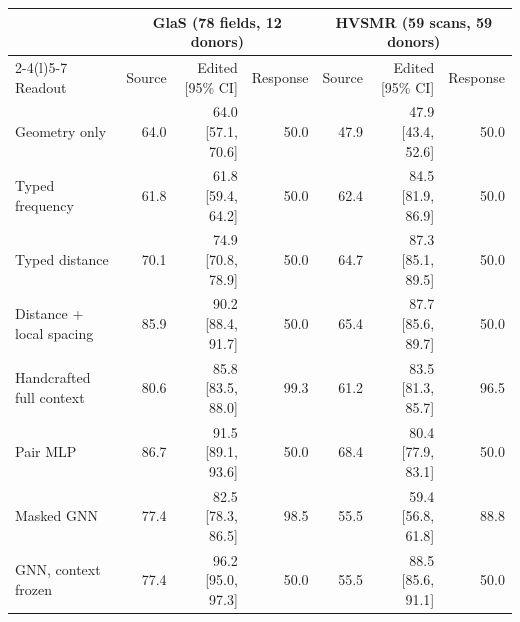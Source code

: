 \begin{tabular}{@{}lrrr@{\hspace{10pt}}rrr@{}}
\toprule
 & \multicolumn{3}{c}{GlaS (78 fields, 12 donors)} & \multicolumn{3}{c}{HVSMR (59 scans, 59 donors)} \\
\cmidrule(lr){2-4}\cmidrule(l){5-7}
Readout & Source & Edited [95\% CI] & Response & Source & Edited [95\% CI] & Response \\
\midrule
Geometry only & 64.0 & 64.0 [57.1, 70.6] & 50.0 & 47.9 & 47.9 [43.4, 52.6] & 50.0 \\
Typed frequency & 61.8 & 61.8 [59.4, 64.2] & 50.0 & 62.4 & 84.5 [81.9, 86.9] & 50.0 \\
Typed distance & 70.1 & 74.9 [70.8, 78.9] & 50.0 & 64.7 & 87.3 [85.1, 89.5] & 50.0 \\
Distance + local spacing & 85.9 & 90.2 [88.4, 91.7] & 50.0 & 65.4 & 87.7 [85.6, 89.7] & 50.0 \\
Handcrafted full context & 80.6 & 85.8 [83.5, 88.0] & 99.3 & 61.2 & 83.5 [81.3, 85.7] & 96.5 \\
\midrule
Pair MLP & 86.7 & 91.5 [89.1, 93.6] & 50.0 & 68.4 & 80.4 [77.9, 83.1] & 50.0 \\
Masked GNN & 77.4 & 82.5 [78.3, 86.5] & 98.5 & 55.5 & 59.4 [56.8, 61.8] & 88.8 \\
GNN, context frozen & 77.4 & 96.2 [95.0, 97.3] & 50.0 & 55.5 & 88.5 [85.6, 91.1] & 50.0 \\
\bottomrule
\end{tabular}
